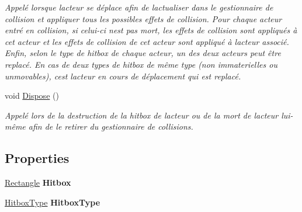\begin{DoxyCompactItemize}
\begin{DoxyCompactList}\small\item\em Appelé lorsque l\textquotesingle{}acteur se déplace afin de l\textquotesingle{}actualiser dans le gestionnaire de collision et appliquer tous les possibles effets de collision. Pour chaque acteur entré en collision, si celui-\/ci n\textquotesingle{}est pas mort, les effets de collision sont appliqués à cet acteur et les effets de collision de cet acteur sont appliqué à l\textquotesingle{}acteur associé. Enfin, selon le type de hitbox de chaque acteur, un des deux acteurs peut être replacé. En cas de deux types de hitbox de même type (non immaterielles ou unmovables), c\textquotesingle{}est l\textquotesingle{}acteur en cours de déplacement qui est replacé. \end{DoxyCompactList}\item 
void \hyperlink{class_tentacle_slicers_1_1collisions_1_1_actor_collision_a6d80fd7d67f1ac25fcc5216c8680896f}{Dispose} ()
\begin{DoxyCompactList}\small\item\em Appelé lors de la destruction de la hitbox de l\textquotesingle{}acteur ou de la mort de l\textquotesingle{}acteur lui-\/même afin de le retirer du gestionnaire de collisions. \end{DoxyCompactList}\end{DoxyCompactItemize}
\subsection*{Properties}
\begin{DoxyCompactItemize}
\item 
\mbox{\label{class_tentacle_slicers_1_1collisions_1_1_actor_collision_a1845b24ded4200b93bbb94e10c988101}} 
\hyperlink{class_tentacle_slicers_1_1collisions_1_1_rectangle}{Rectangle} {\bfseries Hitbox}
\item 
\mbox{\label{class_tentacle_slicers_1_1collisions_1_1_actor_collision_a668e3ecea9834be08b64d9b12555de31}} 
\hyperlink{namespace_tentacle_slicers_1_1collisions_aa7fd5cb9caf0a56384804b6bc00a6f0e}{Hitbox\+Type} {\bfseries Hitbox\+Type}
\end{DoxyCompactItemize}
